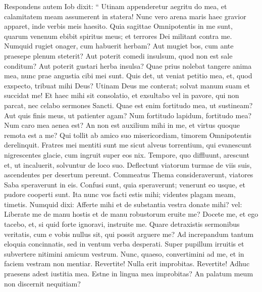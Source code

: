 \begin{biblechapter}
\begin{biblechapter}
\begin{biblechapter}
\begin{biblechapter}
\begin{biblechapter}
\begin{biblechapter}
\verse Respondens autem Iob dixit:
 \verse “ Utinam appenderetur aegritu do mea,
 et calamitatem meam assumerent in statera!
 \verse Nunc vero arena maris haec gravior apparet,
 inde verbis meis haesito.
 \verse Quia sagittae Omnipotentis in me sunt,
 quarum venenum ebibit spiritus meus;
 et terrores Dei militant contra me. \verse Numquid rugiet onager, cum habuerit herbam?
 Aut mugiet bos, cum ante praesepe plenum steterit?
 \verse Aut poterit comedi insulsum, quod non est sale conditum?
 Aut poterit gustari herba insulsa?
 \verse Quae prius nolebat tangere anima mea,
 nunc prae angustia cibi mei sunt.
 \verse Quis det, ut veniat petitio mea,
 et, quod exspecto, tribuat mihi Deus?
 \verse Utinam Deus me conterat;
 solvat manum suam et succidat me! 
\verse Et haec mihi sit consolatio,
 et exsultabo vel in pavore, qui non parcat,
 nec celabo sermones Sancti.
 \verse Quae est enim fortitudo mea, ut sustineam?
 Aut quis finis meus, ut patienter agam?
 \verse Num fortitudo lapidum, fortitudo mea?
 Num caro mea aenea est?
 \verse An non est auxilium mihi in me,
 et virtus quoque remota est a me?
 \verse Qui tollit ab amico suo misericordiam,
 timorem Omnipotentis derelinquit. 
\verse Fratres mei mentiti sunt me
 sicut alveus torrentium, qui evanescunt
 \verse nigrescentes glacie,
 cum ingruit super eos nix.
 \verse Tempore, quo diffluunt, arescunt
 et, ut incaluerit, solvuntur de loco suo.
 \verse Deflectunt viatorum turmae de viis suis,
 ascendentes per desertum pereunt. 
\verse Commeatus Thema consideraverunt,
 viatores Saba speraverunt in eis.
 \verse Confusi sunt, quia speraverunt;
 venerunt eo usque, et pudore cooperti sunt.
 \verse Ita nunc vos facti estis mihi;
 videntes plagam meam, timetis.
 \verse Numquid dixi: Afferte mihi
 et de substantia vestra donate mihi? 
\verse vel: Liberate me de manu hostis
 et de manu robustorum eruite me? 
\verse Docete me, et ego tacebo,
 et, si quid forte ignoravi, instruite me.
 \verse Quare detraxistis sermonibus veritatis,
 cum e vobis nullus sit, qui possit arguere me?
 \verse Ad increpandum tantum eloquia concinnatis,
 sed in ventum verba desperati.
 \verse Super pupillum irruitis
 et subvertere nitimini amicum vestrum.
 \verse Nunc, quaeso, convertimini ad me,
 et in faciem vestram non mentiar.
 \verse Revertite! Nulla erit improbitas.
 Revertite! Adhuc praesens adest iustitia mea.
 \verse Estne in lingua mea improbitas?
 An palatum meum non discernit nequitiam?
 

\end{biblechapter}
\end{biblechapter}
\end{biblechapter}
\end{biblechapter}
\end{biblechapter}
\end{biblechapter}
